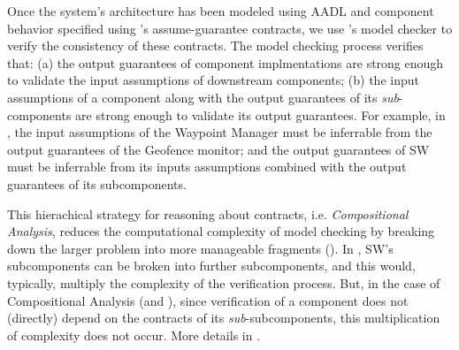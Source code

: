 
Once the system's architecture has been modeled using AADL
and component behavior specified using \agree's assume-guarantee contracts,
we use \agree's model checker to verify the consistency of these contracts.
The model checking process verifies that:
(a) the output guarantees of component implmentations are strong enough to
validate the input assumptions of downstream components;
(b) the input assumptions of a component along with the output guarantees of its \emph{sub}-components
are strong enough to validate its output guarantees.
For example, in ,
the input assumptions of the Waypoint Manager must be inferrable from
the output guarantees of the Geofence monitor;
and the output guarantees of SW must be inferrable from
its inputs assumptions combined with the output guarantees of its subcomponents.

This hierachical strategy for reasoning about contracts,
i.e. \emph{Compositional Analysis},
reduces the computational complexity of model checking
by breaking down the larger problem into more manageable fragments (\cite{compositional-analysis-agree}).
In , SW's subcomponents can be broken into further subcomponents,
and this would, typically, multiply the complexity of the verification process.
But, in the case of Compositional Analysis (and \agree),
since verification of a component does not (directly) depend on the contracts of its \emph{sub}-subcomponents,
this multiplication of complexity does not occur.
More details in \cite{case-models-2021}.
